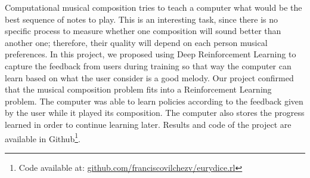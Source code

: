 Computational musical composition tries to teach a computer what would be the best sequence of notes to play. This is an interesting task, since there is no specific process to measure whether one composition will sound better than another one; therefore, their quality will depend on each person musical preferences. In this project, we proposed using Deep Reinforcement Learning to capture the feedback from users during training so that way the computer can learn based on what the user consider is a good melody. Our project confirmed that the musical composition problem fits into a Reinforcement Learning problem. The computer was able to learn policies according to the feedback given by the user while it played its composition. The computer also stores the progress learned in order to continue learning later. Results and code of the project are available in Github\footnote{Code available at: \href{https://github.com/franciscovilchezv/eurydice.rl}{github.com/franciscovilchezv/eurydice.rl}}.